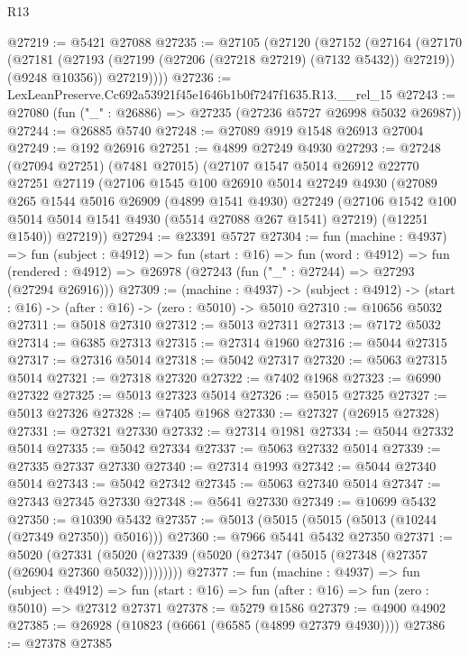 \begin{lexlean}{R13}
\begin{coremodule}
@27219 := @5421 @27088
@27235 := @27105
    (@27120
      (@27152
        (@27164
          (@27170
            (@27181 (@27193 (@27199 (@27206 (@27218 @27219) (@7132 @5432)) @27219)) (@9248 @10356))
            @27219))))
@27236 := LexLeanPreserve.Cc692a53921f45e1646b1b0f7247f1635.R13.__rel_15
@27243 := @27080 (fun ("_" : @26886) => @27235 (@27236 @5727 @26998 @5032 @26987))
@27244 := @26885 @5740
@27248 := @27089 @919 @1548 @26913 @27004
@27249 := @192 @26916
@27251 := @4899 @27249 @4930
@27293 := @27248
    (@27094 @27251)
    (@7481 @27015)
    (@27107
      @1547
      @5014
      @26912
      @22770
      @27251
      @27119
      (@27106
        @1545
        @100
        @26910
        @5014
        @27249
        @4930
        (@27089
          @265
          @1544
          @5016
          @26909
          (@4899 @1541 @4930)
          @27249
          (@27106 @1542 @100 @5014 @5014 @1541 @4930 (@5514 @27088 @267 @1541) @27219)
          (@12251 @1540))
        @27219))
@27294 := @23391 @5727
@27304 := fun (machine : @4937) =>
  fun (subject : @4912) =>
  fun (start : @16) =>
  fun (word : @4912) =>
  fun (rendered : @4912) => @26978 (@27243 (fun ("_" : @27244) => @27293 (@27294 @26916)))
@27309 := (machine : @4937) ->
  (subject : @4912) -> (start : @16) -> (after : @16) -> (zero : @5010) -> @5010
@27310 := @10656 @5032
@27311 := @5018 @27310
@27312 := @5013 @27311
@27313 := @7172 @5032
@27314 := @6385 @27313
@27315 := @27314 @1960
@27316 := @5044 @27315
@27317 := @27316 @5014
@27318 := @5042 @27317
@27320 := @5063 @27315 @5014
@27321 := @27318 @27320
@27322 := @7402 @1968
@27323 := @6990 @27322
@27325 := @5013 @27323 @5014
@27326 := @5015 @27325
@27327 := @5013 @27326
@27328 := @7405 @1968
@27330 := @27327 (@26915 @27328)
@27331 := @27321 @27330
@27332 := @27314 @1981
@27334 := @5044 @27332 @5014
@27335 := @5042 @27334
@27337 := @5063 @27332 @5014
@27339 := @27335 @27337 @27330
@27340 := @27314 @1993
@27342 := @5044 @27340 @5014
@27343 := @5042 @27342
@27345 := @5063 @27340 @5014
@27347 := @27343 @27345 @27330
@27348 := @5641 @27330
@27349 := @10699 @5432
@27350 := @10390 @5432
@27357 := @5013 (@5015 (@5015 (@5013 (@10244 (@27349 @27350)) @5016)))
@27360 := @7966 @5441 @5432 @27350
@27371 := @5020
    (@27331 (@5020 (@27339 (@5020 (@27347 (@5015 (@27348 (@27357 (@26904 @27360 @5032)))))))))
@27377 := fun (machine : @4937) =>
  fun (subject : @4912) =>
  fun (start : @16) => fun (after : @16) => fun (zero : @5010) => @27312 @27371
@27378 := @5279 @1586
@27379 := @4900 @4902
@27385 := @26928 (@10823 (@6661 (@6585 (@4899 @27379 @4930))))
@27386 := @27378 @27385

\end{coremodule}
\end{lexlean}
